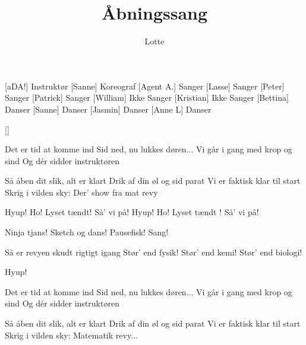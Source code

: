 \documentclass[a4paper,11pt]{article}
\title{Åbningssang}
\author{Lotte}
\begin{document}
\maketitle

\begin{roles}
[aDA!] Instruktør
[Sanne] Koreograf
[Agent A.] Sanger
[Lasse] Sanger
[Peter] Sanger
[Patrick] Sanger
[William] Ikke Sanger
[Kristian] Ikke Sanger
[Bettina] Danser
[Sanne] Danser
[Jasmin] Danser
[Anne L] Danser
\end{roles}

\begin{props}
[]
\end{props}

\begin{song}
 Det er tid at komme ind
Sid ned, nu lukkes døren...
Vi går i gang med krop og sind
Og dér sidder instruktøren

Så åben dit slik, alt er klart
Drik af din øl og sid parat 
Vi er faktisk klar til start
Skrig i vilden sky:
Der' show fra mat revy

Hyup! Ho! Lyset tændt! Så' vi på!
Hyup! Ho! Lyset tændt ! Så' vi på!

Ninja tjans!
Sketch og dans!
Pausefisk!
Sang!

Så er revyen skudt rigtigt igang
Stør' end fysik! Stør' end kemi!
Stør' end biologi! 

Hyup!

Det er tid at komme ind
Sid ned, nu lukkes døren...
Vi går i gang med krop og sind
Og dér sidder instruktøren

Så åben dit slik, alt er klart
Drik af din øl og sid parat 
Vi er faktisk klar til start
Skrig i vilden sky:
Matematik revy...
\end{song}
\end{document}

